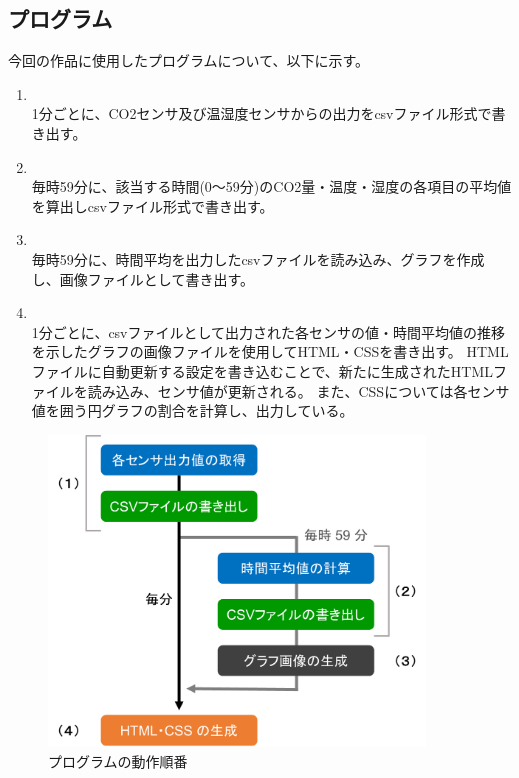 \documentclass[a4paper]{jsarticle}
\begin{document}
\subsection{プログラム}
今回の作品に使用したプログラムについて、以下に示す。
\begin{enumerate}[(1)]
    \item {}\\
    1分ごとに、CO2センサ及び温湿度センサからの出力をcsvファイル形式で書き出す。\\
    \item {}\\
    毎時59分に、該当する時間(0～59分)のCO2量・温度・湿度の各項目の平均値を算出しcsvファイル形式で書き出す。\\
    \item {}\\
    毎時59分に、時間平均を出力したcsvファイルを読み込み、グラフを作成し、画像ファイルとして書き出す。\\
    \item {}\\
    1分ごとに、csvファイルとして出力された各センサの値・時間平均値の推移を示したグラフの画像ファイルを使用してHTML・CSSを書き出す。
    HTMLファイルに自動更新する設定を書き込むことで、新たに生成されたHTMLファイルを読み込み、センサ値が更新される。
    また、CSSについては各センサ値を囲う円グラフの割合を計算し、出力している。\\
\end{enumerate}
\begin{figure}[htbp]
    \begin{center}
        \includegraphics[width=100mm]{images/programs.png}
        \caption{プログラムの動作順番}
    \end{center}
\end{figure}
\end{document}
